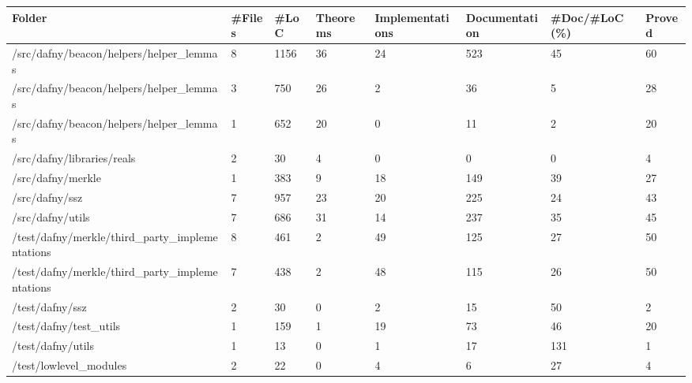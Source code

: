 \documentclass[a4paper, 12pt]{article}
\begin{document}
\vspace{2em}
\begin{tabular}{llllllll}
\toprule
                                         Folder & \#Files &  \#LoC & Theorems & Implementations & Documentation & \#Doc/\#LoC (\%) & Proved \\
\midrule
        /src/dafny/beacon/helpers/helper\_lemmas &      8 &  1156 &       36 &              24 &           523 &            45 &     60 \\
        /src/dafny/beacon/helpers/helper\_lemmas &      3 &   750 &       26 &               2 &            36 &             5 &     28 \\
        /src/dafny/beacon/helpers/helper\_lemmas &      1 &   652 &       20 &               0 &            11 &             2 &     20 \\
                     /src/dafny/libraries/reals &      2 &    30 &        4 &               0 &             0 &             0 &      4 \\
                              /src/dafny/merkle &      1 &   383 &        9 &              18 &           149 &            39 &     27 \\
                                 /src/dafny/ssz &      7 &   957 &       23 &              20 &           225 &            24 &     43 \\
                               /src/dafny/utils &      7 &   686 &       31 &              14 &           237 &            35 &     45 \\
 /test/dafny/merkle/third\_party\_implementations &      8 &   461 &        2 &              49 &           125 &            27 &     50 \\
 /test/dafny/merkle/third\_party\_implementations &      7 &   438 &        2 &              48 &           115 &            26 &     50 \\
                                /test/dafny/ssz &      2 &    30 &        0 &               2 &            15 &            50 &      2 \\
                         /test/dafny/test\_utils &      1 &   159 &        1 &              19 &            73 &            46 &     20 \\
                              /test/dafny/utils &      1 &    13 &        0 &               1 &            17 &           131 &      1 \\
                         /test/lowlevel\_modules &      2 &    22 &        0 &               4 &             6 &            27 &      4 \\
\bottomrule
\end{tabular}
\end{document}
